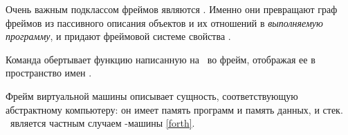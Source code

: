 \clearpage
{}\secdown


\medskip\noindent
Очень важным подклассом фреймов являются . Именно они
превращают граф фреймов из пассивного описания объектов и их отношений в
\emph{выполняемую программу}, и придают фреймовой системе свойства
.

\clearpage
{}\label{cmd}


\medskip\noindent
Команда обертывает функцию написанную на \py\ во фрейм, отображая ее в
пространство имен \metal.

\clearpage
{}\label{vm}


\medskip\noindent
Фрейм виртуальной машины описывает сущность, соответствующую абстрактному
компьютеру: он имеет память программ и память данных, и стек. \ является частным случаем \F-машины
\ref{forth}.

\secup
